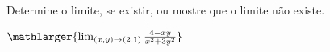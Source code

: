 Determine o limite, se existir, ou mostre que o limite não existe.

\item$\mathlarger{\lim_{(x,y)\rightarrow(2,1)} \frac{4-xy}{x^2+3y^2}}$

